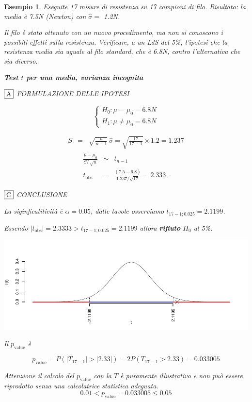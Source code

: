 \documentclass[
  11pt,
]{book}
\theoremstyle{mytheoremstyle}
\theoremstyle{mydefstyle}
\newtheorem{example}{{Esempio}}[section]
\begin{document}
\begin{example}
Eseguite 17 misure di resistenza su 17 campioni di filo. Risultato: la
media è 7.5N (Newton) con \(\hat\sigma=\) 1.2N.

Il filo è stato ottenuto con un nuovo procedimento, ma non si conoscono
i possibili effetti sulla resistenza. Verificare, a un LdS del 5\%,
l'ipotesi che la resistenza media sia uguale al filo standard, che è
6.8N, contro l'alternativa che sia diverso.

\textbf{Test \(t\) per una media, varianza incognita}

\(\fbox{A}\) FORMULAZIONE DELLE IPOTESI

\[\begin{cases}
   H_0: \mu = \mu_0=6.8N \\
   H_1: \mu \neq \mu_0=6.8N 
   \end{cases}\]

\begin{eqnarray*}
   S    &=& \sqrt{\frac{n} {n-1}}\ \widehat{\sigma} 
   =  \sqrt{\frac{ 17 } { 17 -1}} \times  1.2  =  1.237 
   \end{eqnarray*}
\begin{eqnarray*}
   \frac{\hat\mu - \mu_{0}} {S/\,\sqrt{n}}&\sim&t_{n-1}\\
   t_{\text{obs}}
   &=& \frac{ ( 7.5 -  6.8 )} { 1.237 /\sqrt{ 17 }}
   =   2.333 \, .
   \end{eqnarray*}

\(\fbox{C}\) CONCLUSIONE

La siginficatitività è \(\alpha=0.05\), dalle tavole osserviamo \(t_{17-1;0.025}=2.1199\).

Essendo \(|t_\text{obs}|=2.3333>t_{17-1;0.025}=2.1199\) allora \textbf{rifiuto} \(H_0\) al 5\%.

\begin{center}\includegraphics{Appunti_di_Statistica_2025_files/figure-latex/15-test-mu-pi-7-1} \end{center}

Il \(p_{\text{value}}\) è

\[ p_{\text{value}} = P(|T_{17-1}|>|2.33|)=2P(T_{17-1}>2.33)=0.033005 \]

Attenzione il calcolo del \(p_\text{value}\) con la \(T\) è puramente illustrativo e non può essere riprodotto senza una calcolatrice statistica adeguata.\[
 0.01 < p_\text{value}= 0.033005 \leq 0.05 
\]
\end{example}
\end{document}
